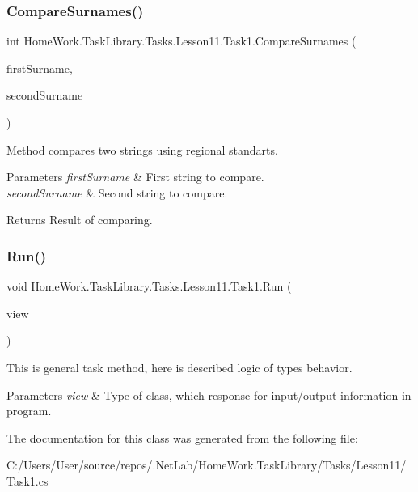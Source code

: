 \subsubsection{\texorpdfstring{CompareSurnames()}{CompareSurnames()}}
{\footnotesize\ttfamily int Home\+Work.\+Task\+Library.\+Tasks.\+Lesson11.\+Task1.\+Compare\+Surnames (\begin{DoxyParamCaption}\item[{string}]{first\+Surname,  }\item[{string}]{second\+Surname }\end{DoxyParamCaption})\hspace{0.3cm}{\ttfamily [private]}}



Method compares two strings using regional standarts. 


\begin{DoxyParams}{Parameters}
{\em first\+Surname} & First string to compare.\\
\hline
{\em second\+Surname} & Second string to compare.\\
\hline
\end{DoxyParams}
\begin{DoxyReturn}{Returns}
Result of comparing.
\end{DoxyReturn}
\mbox{\label{class_home_work_1_1_task_library_1_1_tasks_1_1_lesson11_1_1_task1_a0af293bc57bda8a21bd7dac20fb41077}} 
\subsubsection{\texorpdfstring{Run()}{Run()}}
{\footnotesize\ttfamily void Home\+Work.\+Task\+Library.\+Tasks.\+Lesson11.\+Task1.\+Run (\begin{DoxyParamCaption}\item[{I\+Information}]{view }\end{DoxyParamCaption})}



This is general task method, here is described logic of types behavior. 


\begin{DoxyParams}{Parameters}
{\em view} & Type of class, which response for input/output information in program.\\
\hline
\end{DoxyParams}


The documentation for this class was generated from the following file\+:\begin{DoxyCompactItemize}
\item 
C\+:/\+Users/\+User/source/repos/.\+Net\+Lab/\+Home\+Work.\+Task\+Library/\+Tasks/\+Lesson11/Task1.\+cs\end{DoxyCompactItemize}
